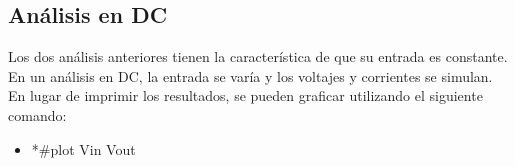 \documentclass{article}
\begin{document}
	\subsection*{Análisis en DC}
	Los dos análisis anteriores tienen la característica de que su entrada es constante. En un análisis en DC, la entrada se varía y los voltajes y corrientes se simulan. En lugar de imprimir los resultados, se pueden graficar utilizando el siguiente comando:
	\begin{itemize}
		\item *\#plot Vin Vout
	\end{itemize}
\end{document}
